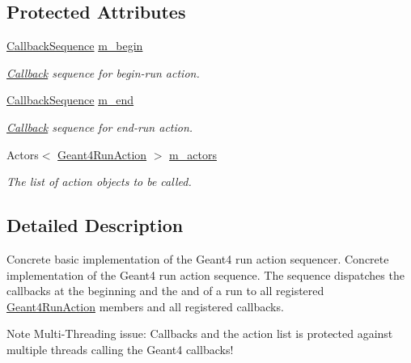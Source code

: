 \subsection*{Protected Attributes}
\begin{DoxyCompactItemize}
\item 
\hyperlink{struct_d_d4hep_1_1_callback_sequence}{CallbackSequence} \hyperlink{class_d_d4hep_1_1_simulation_1_1_geant4_run_action_sequence_a833ebd7f7da62ebeeb561815387b0bbe}{m\_\-begin}
\begin{DoxyCompactList}\small\item\em \hyperlink{class_d_d4hep_1_1_callback}{Callback} sequence for begin-\/run action. \item\end{DoxyCompactList}\item 
\hyperlink{struct_d_d4hep_1_1_callback_sequence}{CallbackSequence} \hyperlink{class_d_d4hep_1_1_simulation_1_1_geant4_run_action_sequence_a94c03005b1c789e05144558c840737f6}{m\_\-end}
\begin{DoxyCompactList}\small\item\em \hyperlink{class_d_d4hep_1_1_callback}{Callback} sequence for end-\/run action. \item\end{DoxyCompactList}\item 
Actors$<$ \hyperlink{class_d_d4hep_1_1_simulation_1_1_geant4_run_action}{Geant4RunAction} $>$ \hyperlink{class_d_d4hep_1_1_simulation_1_1_geant4_run_action_sequence_a780b499622542d52941141b108ab1258}{m\_\-actors}
\begin{DoxyCompactList}\small\item\em The list of action objects to be called. \item\end{DoxyCompactList}\end{DoxyCompactItemize}


\subsection{Detailed Description}
Concrete basic implementation of the Geant4 run action sequencer. Concrete implementation of the Geant4 run action sequence. The sequence dispatches the callbacks at the beginning and the and of a run to all registered \hyperlink{class_d_d4hep_1_1_simulation_1_1_geant4_run_action}{Geant4RunAction} members and all registered callbacks.

Note Multi-\/Threading issue: Callbacks and the action list is protected against multiple threads calling the Geant4 callbacks!

